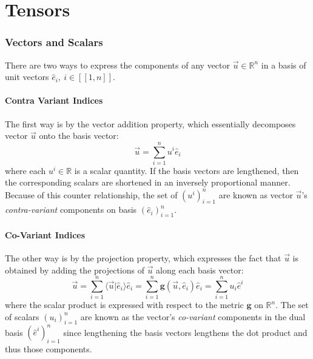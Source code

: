 \chapter{Tensors}
\label{apx:tensors}
{\color{purple}\titlerule[2.5pt]}
\vspace{4pc}%

\subsection{Vectors and Scalars}

There are two ways to express the components of any vector $\vec{u} \in \mathbb{R}^n$ in a basis of unit vectors $\hat{e}_i, ~i \in [\![ 1, n ]\!]$.

\subsubsection{Contra Variant Indices}

The first way is by the vector addition property, which essentially decomposes vector $\vec{u}$ onto the basis vector:\\
\begin{equation}
\vec{u} = \sum_{i=1}^{n} u^i \hat{e}_i
\end{equation} where each $u^i \in \mathbb{R}$ is a scalar quantity. If the basis vectors are lengthened, then the corresponding scalars are shortened in an inversely proportional manner. Because of this counter relationship, the set of $\left( u^i \right)_{i=1}^{n}$ are known as vector $\vec{u}$'s \emph{contra-variant} components on basis $\left( \hat{e}_i \right)_{i=1}^{n}$.

\subsubsection{Co-Variant Indices}

The other way is by the projection property, which expresses the fact that $\vec{u}$ is obtained by adding the projections of $\vec{u}$ along each basis vector:\\
\begin{equation}
\vec{u} = \sum_{i=1}^{n} \langle\vec{u} \vert \hat{e}_i \rangle \hat{e}_i = 
\sum_{i=1}^{n} \pmb{g}(\vec{u}, \hat{e}_i)  \hat{e}_i = \sum_{i=1}^{n} u_i \hat{e}^i
\end{equation} where the scalar product is expressed with respect to the metric $\pmb{g}$ on $\mathbb{R}^n$. The set of scalars $\left( u_i \right)_{i=1}^{n}$ 
are known as the vector's \emph{co-variant} components in the dual basis $\left( \hat{e}^i \right)_{i=1}^{n}$ since lengthening the basis vectors lengthens the dot product and thus those components.\\

